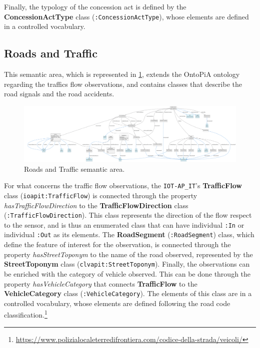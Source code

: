 Finally, the typology of the concession act is defined by the \textbf{ConcessionActType} class (\verb#:ConcessionActType#), whose elements are defined in a controlled vocabulary.

\subsection{Roads and Traffic}
\label{subsec:roads-traffic}

This semantic area, which is represented in \ref{fig:roads-sa}, extends the OntoPiA ontology regarding the traffics flow observations, and contains classes that describe the road signals and the road accidents.

\begin{figure}
  \centering
  \includegraphics[width=\columnwidth]{images/ontoim/roads}
  \caption{Roads and Traffic semantic area.}
  \label{fig:roads-sa}
\end{figure}

For what concerns the traffic flow observations, the \verb#IOT-AP_IT#'s \textbf{TrafficFlow} class (\verb#ioapit:TrafficFlow#) is connected through the property \textit{hasTrafficFlowDirection} to the \textbf{TrafficFlowDirection} class (\verb#:TrafficFlowDirection#). This class represents the direction of the flow respect to the sensor, and is thus an enumerated class that can have individual \verb#:In# or individual \verb#:Out# as its elements. The \textbf{RoadSegment} (\verb#:RoadSegment#) class, which define the feature of interest for the observation, is connected through the property \textit{hasStreetToponym} to the name of the road observed, represented by the \textbf{StreetToponym} class (\verb#clvapit:StreetToponym#). Finally, the observations can be enriched with the category of vehicle observed. This can be done through the property \textit{hasVehicleCategory} that connects \textbf{TrafficFlow} to the \textbf{VehicleCategory} class (\verb#:VehicleCategory#). The elements of this class are in a controlled vocabulary, whose elements are defined following the road code classification.\footnote{\url{https://www.polizialocaleterredifrontiera.com/codice-della-strada/veicoli/}}

